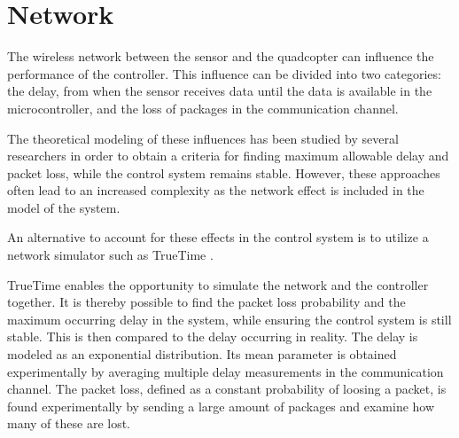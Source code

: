 \section{Network}
The wireless network between the sensor and the quadcopter can influence the performance of the controller. This influence can be divided into two categories: the delay, from when the sensor receives data until the data is available in the microcontroller, and the loss of packages in the communication channel.


The theoretical modeling of these influences has been studied by several researchers in order to obtain a criteria for finding maximum allowable delay and packet loss, while the control system remains stable. However, these approaches often lead to an increased complexity as the network effect is included in the model of the system. 

An alternative to account for these effects in the control system is to utilize a network simulator such as TrueTime \cite{TrueTimeNew}.

TrueTime enables the opportunity to simulate the network and the controller together. It is thereby possible to find the packet loss probability and the maximum occurring delay in the system, while ensuring the control system is still stable. This is then compared to the delay occurring in reality. The delay is modeled as an exponential distribution. Its mean parameter is obtained experimentally by averaging multiple delay measurements in the communication channel. The packet loss, defined as a constant probability of loosing a packet, is found experimentally by sending a large amount of packages and examine how many of these are lost.  

